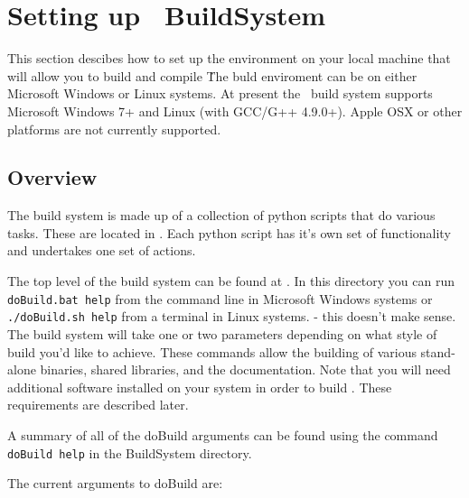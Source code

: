 \section{Setting up \CNAME\ BuildSystem\label{sec:build_environment}}

This section descibes how to set up the environment on your local machine that will allow you to build and compile \CNAME\. The buld enviroment can be on either Microsoft Windows or Linux systems. At present the \CNAME\ build system supports Microsoft Windows 7+ and Linux (with GCC/G++ 4.9.0+). Apple OSX or other platforms are not currently supported.

\subsection{Overview}

The build system is made up of a collection of python scripts that do various tasks. These are located in . Each python script has it’s own set of functionality and undertakes one set of actions. 

The top level of the build system can be found at . In this directory you can run \texttt{doBuild.bat help} from the command line in Microsoft Windows systems or \texttt{./doBuild.sh help} from a terminal in Linux systems.
 - this doesn't make sense.
The build system will take one or two parameters depending on what style of build you'd like to achieve. These commands allow the building of various stand-alone binaries, shared libraries, and the documentation. Note that you will need additional software installed on your system in order to build \CNAME . These requirements are described later.

A summary of all of the doBuild arguments can be found using the command \texttt{doBuild help} in the BuildSystem directory.

The current arguments to doBuild are: 

